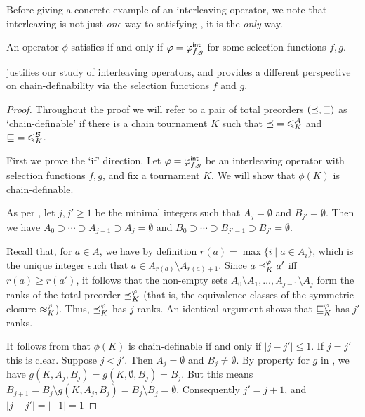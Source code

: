 Before giving a concrete example of an interleaving operator, we note that
interleaving is not just \emph{one} way to satisfying \chaindef{}, it
is the \emph{only} way.

\begin{theorem}
   \label{tourn_result_chaindef_iff_interleaving}

    An operator $\phi$ satisfies \chaindef{} if and only if $\varphi =
    {\varphi_{f,g}^\mathsf{int}}$ for some selection functions $f, g$.

\end{theorem}

 justifies our study of interleaving
operators, and provides a different perspective on chain-definability via the
selection functions $f$ and $g$.

\begin{proof}

    Throughout the proof we will refer to a pair of total preorders
    $({\preceq}, {\sqsubseteq})$ as `chain-definable' if there is a chain tournament $K$
    such that ${\preceq} = {\leqslant^{\mathcal{A}}_K}$ and ${\sqsubseteq} = {\leqslant^{\mathcal{B}}_K}$.

    First we prove the `if' direction. Let $\varphi = {\varphi_{f,g}^\mathsf{int}}$ be an
    interleaving operator with selection functions $f, g$, and fix a
    tournament $K$. We will show that $\phi(K)$ is chain-definable.

    As per , let $j, j' \ge 1$ be the
    minimal integers such that $A_j = \emptyset$ and $B_{j'} = \emptyset$. Then
    we have $A_0 \supset \cdots \supset A_{j-1} \supset A_j = \emptyset$ and
    $B_0 \supset \cdots \supset B_{j'-1} \supset B_{j'} = \emptyset$.

    Recall that, for $a \in A$, we have by definition $r(a) = \max\{i \mid a
    \in A_i\}$, which is the unique integer such that $a \in A_{r(a)} \setminus
    A_{{r(a)}+1}$. Since $a \preceq_K^\varphi a'$ iff $r(a) \ge r(a')$, it follows
    that the non-empty sets $A_0 \setminus A_1, \ldots, A_{j-1} \setminus A_j$
    form the ranks of the total preorder ${\preceq_K^\varphi}$ (that is, the
    equivalence classes of the symmetric closure ${\approx_K^\varphi}$). Thus,
    ${\preceq_K^\varphi}$ has $j$ ranks. An identical argument shows that
    ${\sqsubseteq_K^\varphi}$ has $j'$ ranks.

    It follows from  that $\phi(K)$
    is chain-definable if and only if $|j - j'| \le 1$.  If $j = j'$ this is
    clear. Suppose $j < j'$.  Then $A_j = \emptyset$ and $B_j \ne \emptyset$.
    By property  for $g$ in
    , we have $g(K, A_j, B_j) = g(K, \emptyset,
    B_j) = B_j$. But this means $B_{j+1} = B_j \setminus g(K, A_j, B_j) = B_j
    \setminus B_j = \emptyset$.  Consequently $j' = j+1$, and $|j - j'| = |-1|
    = 1$


\end{proof}
